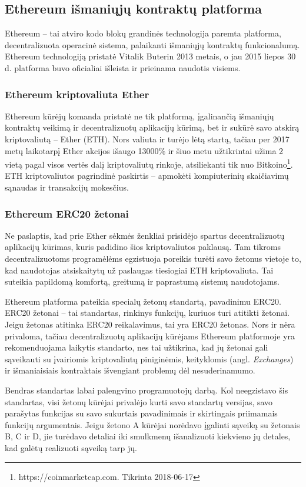 \documentclass{VUMIFPSkursinis}
\begin{document}
\subsection{Ethereum išmaniųjų kontraktų platforma}
Ethereum – tai atviro kodo blokų grandinės technologija paremta platforma, decentralizuota operacinė sistema, palaikanti išmaniųjų kontraktų funkcionalumą. Ethereum technologiją pristatė Vitalik Buterin 2013 metais, o jau 2015 liepos 30 d. platforma buvo oficialiai išleista ir prieinama naudotis visiems. 

\subsubsection{Ethereum kriptovaliuta Ether}
Ethereum kūrėjų komanda pristatė ne tik platformą, įgalinančią išmaniųjų kontraktų veikimą ir decentralizuotų aplikacijų kūrimą, bet ir sukūrė savo atskirą kriptovaliutą – Ether (ETH). Nors valiuta ir turėjo lėtą startą, tačiau per 2017 metų laikotarpį Ether akcijos išaugo 13000\% ir šiuo metu užtikrintai užima 2 vietą pagal visos vertės dalį kriptovaliutų rinkoje, atsiliekanti tik nuo Bitkoino\footnote{https://coinmarketcap.com. Tikrinta 2018-06-17}. ETH kriptovaliutos pagrindinė paskirtis – apmokėti kompiuterinių skaičiavimų sąnaudas ir transakcijų mokesčius.

\subsubsection{Ethereum ERC20 žetonai}
Ne paslaptis, kad prie Ether sėkmės ženkliai prisidėjo spartus decentralizuotų aplikacijų kūrimas, kuris padidino šios kriptovaliutos paklausą. Tam tikroms decentralizuotoms programėlėms egzistuoja poreikis turėti savo žetonus vietoje to, kad naudotojas atsiskaitytų už paslaugas tiesiogiai ETH kriptovaliuta. Tai suteikia papildomą komfortą, greitumą ir paprastumą sistemų naudotojams. 

Ethereum platforma pateikia specialų žetonų standartą, pavadinimu ERC20. ERC20 žetonai – tai standartas, rinkinys funkcijų, kuriuos turi atitikti žetonai. Jeigu žetonas atitinka ERC20 reikalavimus, tai yra ERC20 žetonas. Nors ir nėra privaloma, tačiau decentralizuotų aplikacijų kūrėjams Ethereum platformoje yra rekomenduojama laikytis standarto, nes tai užtikrina, kad jų žetonai gali sąveikauti su įvairiomis kriptovaliutų piniginėmis, keityklomis (angl. \textit{Exchanges}) ir išmaniaisiais kontraktais išvengiant problemų dėl nesuderinamumo. 

Bendras standartas labai palengvino programuotojų darbą. Kol neegzistavo šis standartas, visi žetonų kūrėjai privalėjo kurti savo standartų versijas, savo parašytas funkcijas su savo sukurtais pavadinimais ir skirtingais priimamais funkcijų argumentais. Jeigu žetono A kūrėjai norėdavo įgalinti sąveiką su žetonais B, C ir D, jie turėdavo detaliai iki smulkmenų išanalizuoti kiekvieno jų detales, kad galėtų realizuoti sąveiką tarp jų.
\end{document}
